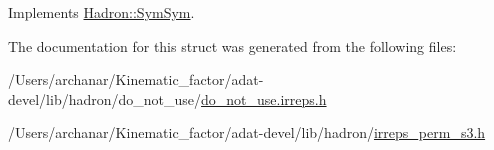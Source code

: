 Implements \mbox{\hyperlink{structHadron_1_1SymSym_aa6e588740862036933a9efe085a5e5e5}{Hadron\+::\+Sym\+Sym}}.



The documentation for this struct was generated from the following files\+:\begin{DoxyCompactItemize}
\item 
/\+Users/archanar/\+Kinematic\+\_\+factor/adat-\/devel/lib/hadron/do\+\_\+not\+\_\+use/\mbox{\hyperlink{adat-devel_2lib_2hadron_2do__not__use_2do__not__use_8irreps_8h}{do\+\_\+not\+\_\+use.\+irreps.\+h}}\item 
/\+Users/archanar/\+Kinematic\+\_\+factor/adat-\/devel/lib/hadron/\mbox{\hyperlink{adat-devel_2lib_2hadron_2irreps__perm__s3_8h}{irreps\+\_\+perm\+\_\+s3.\+h}}\end{DoxyCompactItemize}
